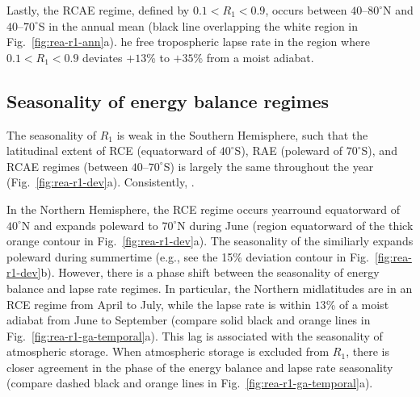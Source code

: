 \documentclass{ametsocV5}
\begin{document}
    Lastly, the RCAE regime, defined by $0.1 < R_1 < 0.9$, occurs between $40$--$80^\circ$N and $40$--$70^\circ$S in the annual mean (black line overlapping the white region in Fig.~\ref{fig:rea-r1-ann}a). he free tropospheric lapse rate in the region where $0.1 < R_1 < 0.9$ deviates $+13$\% to $+35$\% from a moist adiabat.

    \subsection{Seasonality of energy balance regimes} \label{subsec:seasonality}
    The seasonality of $R_1$ is weak in the Southern Hemisphere, such that the latitudinal extent of RCE (equatorward of $40^\circ$S), RAE (poleward of $70^\circ$S), and RCAE regimes (between $40$--$70^\circ$S) is largely the same throughout the year (Fig.~\ref{fig:rea-r1-dev}a). Consistently, .

    In the Northern Hemisphere, the RCE regime occurs yearround equatorward of $40^\circ$N and expands poleward to $70^\circ$N during June (region equatorward of the thick orange contour in Fig.~\ref{fig:rea-r1-dev}a). The seasonality of the  similiarly expands poleward during summertime (e.g., see the 15\% deviation contour in Fig.~\ref{fig:rea-r1-dev}b). However, there is a phase shift between the seasonality of energy balance and lapse rate regimes. In particular, the Northern midlatitudes are in an RCE regime from April to July, while the lapse rate is within $13$\% of a moist adiabat from June to September (compare solid black and orange lines in Fig.~\ref{fig:rea-r1-ga-temporal}a). This lag is associated with the seasonality of atmospheric storage. When atmospheric storage is excluded from $R_1$, there is closer agreement in the phase of the energy balance and lapse rate seasonality (compare dashed black and orange lines in Fig.~\ref{fig:rea-r1-ga-temporal}a).
\end{document}
